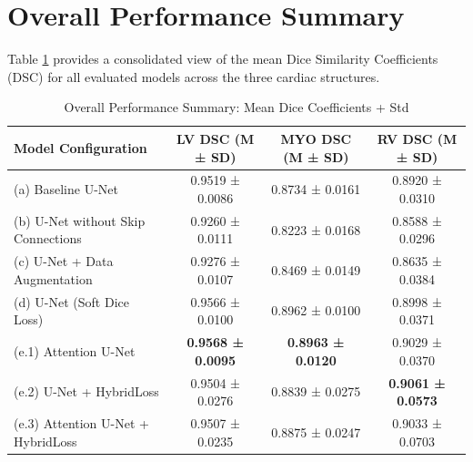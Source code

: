 \documentclass{article}
\begin{document}
\section{Overall Performance Summary}
Table \ref{tab:overall_summary} provides a consolidated view of the mean Dice Similarity Coefficients (DSC) for all evaluated models across the three cardiac structures.

\begin{table}[H]
  \centering
  \caption{Overall Performance Summary: Mean Dice Coefficients + Std}
  \label{tab:overall_summary}
  \begin{tabular}{lccc}
    \toprule
    Model Configuration                & LV DSC (M ± SD)          & MYO DSC (M ± SD)         & RV DSC (M ± SD)          \\
    \midrule
    (a) Baseline U-Net                 & 0.9519 ± 0.0086          & 0.8734 ± 0.0161          & 0.8920 ± 0.0310          \\
    (b) U-Net without Skip Connections & 0.9260 ± 0.0111          & 0.8223 ± 0.0168          & 0.8588 ± 0.0296          \\
    (c) U-Net + Data Augmentation      & 0.9276 ± 0.0107          & 0.8469 ± 0.0149          & 0.8635 ± 0.0384          \\
    (d) U-Net (Soft Dice Loss)         & 0.9566 ± 0.0100          & 0.8962 ± 0.0100          & 0.8998 ± 0.0371          \\
    (e.1) Attention U-Net              & \textbf{0.9568 ± 0.0095} & \textbf{0.8963 ± 0.0120} & 0.9029 ± 0.0370          \\
    (e.2) U-Net + HybridLoss           & 0.9504 ± 0.0276          & 0.8839 ± 0.0275          & \textbf{0.9061 ± 0.0573} \\
    (e.3) Attention U-Net + HybridLoss & 0.9507 ± 0.0235          & 0.8875 ± 0.0247          & 0.9033 ± 0.0703          \\
    \bottomrule
  \end{tabular}
\end{table}
\end{document}
